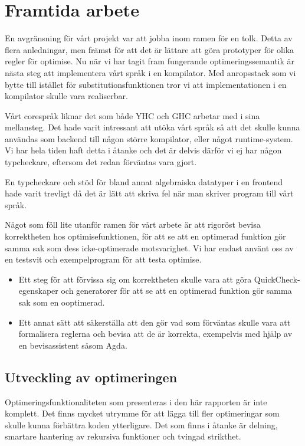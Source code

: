 \documentclass[Rapport]{subfiles}
\begin{document}
\section{Framtida arbete}
En avgränsning för vårt projekt var att jobba inom ramen för en tolk. 
Detta av flera anledningar, men främst för att det är lättare att göra prototyper för 
olika regler för optimise. Nu när vi har tagit fram fungerande optimeringssemantik 
är nästa steg att implementera vårt språk i en kompilator.
Med anropsstack som vi bytte till istället för substitutionsfunktionen tror vi att implementationen
i en kompilator skulle vara realiserbar.


Vårt corespråk liknar det som både YHC och GHC arbetar med i sina mellansteg.
Det hade varit intressant att utöka vårt språk så att det skulle kunna 
användas som backend till någon större kompilator, eller något runtime-system.
Vi har hela tiden haft detta i åtanke och det är delvis därför vi ej har någon 
typcheckare, eftersom det redan förväntas vara gjort.


En typcheckare och stöd för bland annat algebraiska datatyper i en 
frontend hade varit trevligt då det är lätt att skriva fel när man skriver
program till vårt språk. 


Något som föll lite utanför ramen för vårt arbete är att rigoröst bevisa
korrektheten hos optimisefunktionen, för att se att en optimerad funktion
gör samma sak som dess icke-optimerade motsvarighet. Vi har endast använt oss av en testsvit
och exempelprogram för att testa optimise. 

\begin{itemize}
\item Ett steg för att förvissa sig om korrektheten skulle vara att göra QuickCheck-egenskaper och generatorer för att se att en optimerad funktion gör samma sak som en ooptimerad. 
\item Ett annat sätt att säkerställa att den
gör vad som förväntas skulle vara att formalisera reglerna och bevisa
att de är korrekta, exempelvis med hjälp av en bevisassistent såsom Agda.
\end{itemize}

\subsection{Utveckling av optimeringen}

Optimeringsfunktionaliteten som presenteras i den här rapporten är inte
komplett. Det finns mycket utrymme för att lägga till fler optimeringar
som skulle kunna förbättra koden ytterligare. Det som finns i åtanke är
delning, smartare hantering av rekursiva funktioner och tvingad strikthet.
\end{document}
